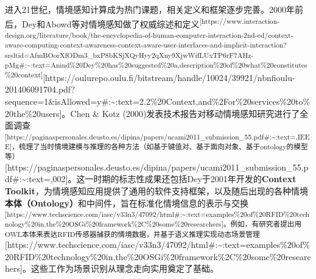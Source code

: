 \documentclass[
  letterpaper,
]{scrbook}
\begin{document}
进入21世纪，情境感知计算成为热门课题，相关定义和框架逐步完善。2000年前后，Dey和Abowd等对情境感知做了权威综述和定义\textsuperscript{{[}https://www.interaction-design.org/literature/book/the-encyclopedia-of-human-computer-interaction-2nd-ed/context-aware-computing-context-awareness-context-aware-user-interfaces-and-implicit-interaction?srsltid=AfmBOorXfODm3\_bxP8bKSjXQyHyy2qXny9XjwWifLUxTP6rF7AHz-pMg\#:\textasciitilde:text=Anind\%20Dey\%20has\%20suggested\%20a,description\%20of\%20what\%20constitutes\%20context{]}}{[}https://oulurepo.oulu.fi/bitstream/handle/10024/39921/nbnfioulu-201406091704.pdf?sequence=1\&isAllowed=y\#:\textasciitilde:text=2.2\%20Context,and\%2For\%20services\%20to\%20the\%20users{]}。Chen
\& Kotz
(2000)发表技术报告对移动情境感知研究进行了全面调查\textsuperscript{{[}https://paginaspersonales.deusto.es/dipina/papers/ucami2011\_submission\_55.pdf\#:\textasciitilde:text=,IEEE{]}，梳理了当时情境建模与推理的各种方法（如基于键值对、基于面向对象、基于ontology的模型等）}{[}https://paginaspersonales.deusto.es/dipina/papers/ucami2011\_submission\_55.pdf\#:\textasciitilde:text=,002{]}。这一时期的标志性成果还包括Dey于2001年开发的\textbf{Context
Toolkit}，为情境感知应用提供了通用的软件支持框架，以及随后出现的各种情境\textbf{本体（Ontology）}和中间件，旨在标准化情境信息的表示与交换\textsuperscript{{[}https://www.techscience.com/iasc/v33n3/47092/html\#:\textasciitilde:text=examples\%20of\%20RFID\%20technology\%20in,the\%20OSGi\%20framework\%2C\%20some\%20researchers{]}。例如，有研究者提出用OWL本体来表达RFID传感器捕获的情境数据，并基于语义推理实现动态场景管理}{[}https://www.techscience.com/iasc/v33n3/47092/html\#:\textasciitilde:text=examples\%20of\%20RFID\%20technology\%20in,the\%20OSGi\%20framework\%2C\%20some\%20researchers{]}。这些工作为场景识别从理念走向实用奠定了基础。
\end{document}
